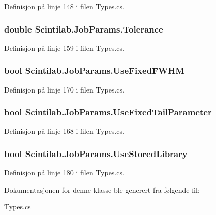Definisjon på linje 148 i filen Types.\+cs.

\hypertarget{class_scintilab_1_1_job_params_aa691196ec6fcf464879b00d2b844df04}{
\subsubsection[{Tolerance}]{\setlength{\rightskip}{0pt plus 5cm}double Scintilab.\+Job\+Params.\+Tolerance}}\label{class_scintilab_1_1_job_params_aa691196ec6fcf464879b00d2b844df04}


Definisjon på linje 159 i filen Types.\+cs.

\hypertarget{class_scintilab_1_1_job_params_a8b87658f7291b548c701523311412220}{
\subsubsection[{Use\+Fixed\+F\+W\+H\+M}]{\setlength{\rightskip}{0pt plus 5cm}bool Scintilab.\+Job\+Params.\+Use\+Fixed\+F\+W\+H\+M}}\label{class_scintilab_1_1_job_params_a8b87658f7291b548c701523311412220}


Definisjon på linje 170 i filen Types.\+cs.

\hypertarget{class_scintilab_1_1_job_params_a6c217fb07858b573416969adccff67fe}{
\subsubsection[{Use\+Fixed\+Tail\+Parameter}]{\setlength{\rightskip}{0pt plus 5cm}bool Scintilab.\+Job\+Params.\+Use\+Fixed\+Tail\+Parameter}}\label{class_scintilab_1_1_job_params_a6c217fb07858b573416969adccff67fe}


Definisjon på linje 168 i filen Types.\+cs.

\hypertarget{class_scintilab_1_1_job_params_a1512decdca52cc00a01713c41e1c173f}{
\subsubsection[{Use\+Stored\+Library}]{\setlength{\rightskip}{0pt plus 5cm}bool Scintilab.\+Job\+Params.\+Use\+Stored\+Library}}\label{class_scintilab_1_1_job_params_a1512decdca52cc00a01713c41e1c173f}


Definisjon på linje 180 i filen Types.\+cs.



Dokumentasjonen for denne klasse ble generert fra følgende fil\+:\begin{DoxyCompactItemize}
\item 
\hyperlink{_types_8cs}{Types.\+cs}\end{DoxyCompactItemize}
